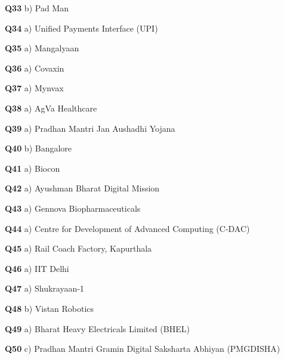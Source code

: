\textbf{Q33} b) Pad Man\par
\textbf{Q34} a) Unified Payments Interface (UPI)\par
\textbf{Q35} a) Mangalyaan\par
\textbf{Q36} a) Covaxin\par
\textbf{Q37} a) Mynvax\par
\textbf{Q38} a) AgVa Healthcare\par
\textbf{Q39} a) Pradhan Mantri Jan Aushadhi Yojana\par
\textbf{Q40} b) Bangalore\par
\textbf{Q41} a) Biocon\par
\textbf{Q42} a) Ayushman Bharat Digital Mission\par
\textbf{Q43} a) Gennova Biopharmaceuticals\par
\textbf{Q44} a) Centre for Development of Advanced Computing (C‑DAC)\par
\textbf{Q45} a) Rail Coach Factory, Kapurthala\par
\textbf{Q46} a) IIT Delhi\par
\textbf{Q47} a) Shukrayaan‑1\par
\textbf{Q48} b) Vistan Robotics\par
\textbf{Q49} a) Bharat Heavy Electricals Limited (BHEL)\par
\textbf{Q50} c) Pradhan Mantri Gramin Digital Saksharta Abhiyan (PMGDISHA)\par